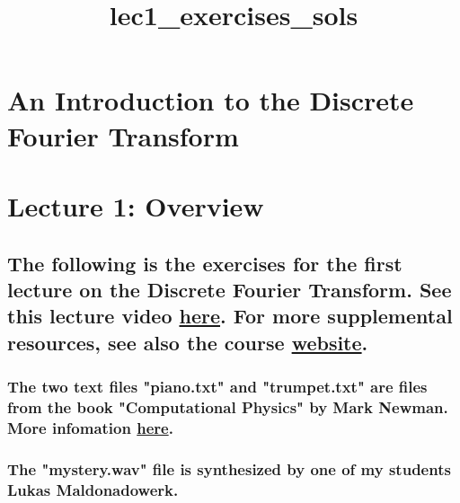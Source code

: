 \documentclass[11pt]{article}
\title{lec1\_exercises\_sols}
\begin{document}
    
    
    \maketitle
    
    

    
    \section{An Introduction to the Discrete Fourier
Transform}\label{an-introduction-to-the-discrete-fourier-transform}

\section{Lecture 1: Overview}\label{lecture-1-overview}

\subsection{\texorpdfstring{The following is the exercises for the first
lecture on the Discrete Fourier Transform. See this lecture video
\href{https://www.youtube.com/watch?v=t8idDnMtNx8}{here}. For more
supplemental resources, see also the course
\href{https://longbaonguyen.github.io/courses/dft/discrete_fourier.html}{website}.}{The following is the exercises for the first lecture on the Discrete Fourier Transform. See this lecture video here. For more supplemental resources, see also the course website.}}\label{the-following-is-the-exercises-for-the-first-lecture-on-the-discrete-fourier-transform.-see-this-lecture-video-here.-for-more-supplemental-resources-see-also-the-course-website.}

\subsubsection{\texorpdfstring{The two text files "piano.txt" and
"trumpet.txt" are files from the book "Computational Physics" by Mark
Newman. More infomation
\href{http://www-personal.umich.edu/~mejn/cp/}{here}.}{The two text files "piano.txt" and "trumpet.txt" are files from the book "Computational Physics" by Mark Newman. More infomation here.}}\label{the-two-text-files-piano.txt-and-trumpet.txt-are-files-from-the-book-computational-physics-by-mark-newman.-more-infomation-here.}

\subsubsection{The "mystery.wav" file is synthesized by one of my
students Lukas
Maldonadowerk.}\label{the-mystery.wav-file-is-synthesized-by-one-of-my-students-lukas-maldonadowerk.}
\end{document}
